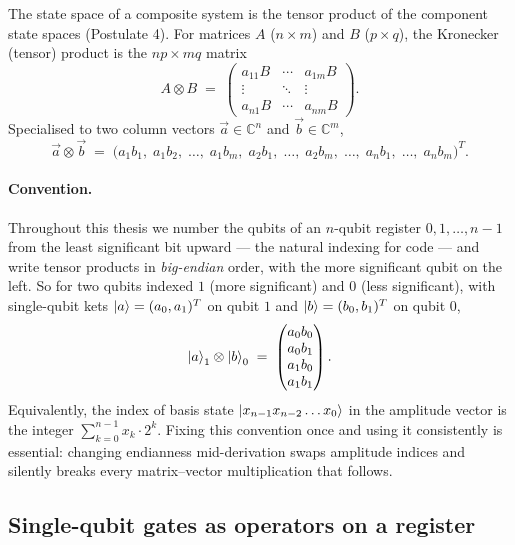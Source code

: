 The state space of a composite system is the tensor product of the component state spaces (Postulate 4). For matrices $A$ ($n\times m$) and $B$ ($p\times q$), the Kronecker (tensor) product is the $np\times mq$ matrix
\begin{equation}
A\otimes B \;=\; \begin{pmatrix} a_{11}B & \cdots & a_{1m}B \\ \vdots & \ddots & \vdots \\ a_{n1}B & \cdots & a_{nm}B \end{pmatrix}.
\end{equation}
Specialised to two column vectors $\vec{a}\in\mathbb{C}^n$ and $\vec{b}\in\mathbb{C}^m$,
\begin{equation}
\vec{a}\otimes\vec{b} \;=\; \bigl(a_1 b_1,\; a_1 b_2,\; \ldots,\; a_1 b_m,\; a_2 b_1,\; \ldots,\; a_2 b_m,\; \ldots,\; a_n b_1,\; \ldots,\; a_n b_m\bigr)^T.
\end{equation}

\paragraph{Convention.} Throughout this thesis we number the qubits of an $n$-qubit register $0, 1, \ldots, n-1$ from the least significant bit upward --- the natural indexing for code --- and write tensor products in \emph{big-endian} order, with the more significant qubit on the left. So for two qubits indexed $1$ (more significant) and $0$ (less significant), with single-qubit kets $\mathinner{|{a}\rangle}=(a_0, a_1)^T$ on qubit $1$ and $\mathinner{|{b}\rangle}=(b_0, b_1)^T$ on qubit $0$,
\begin{equation}
\mathinner{|{a}\rangle}_1 \otimes \mathinner{|{b}\rangle}_0 \;=\; \begin{pmatrix} a_0 b_0 \\ a_0 b_1 \\ a_1 b_0 \\ a_1 b_1 \end{pmatrix}.
\end{equation}
Equivalently, the index of basis state $\mathinner{|{x_{n-1} x_{n-2} \ldots x_0}\rangle}$ in the amplitude vector is the integer $\sum_{k=0}^{n-1} x_k \cdot 2^k$. Fixing this convention once and using it consistently is essential: changing endianness mid-derivation swaps amplitude indices and silently breaks every matrix--vector multiplication that follows.

\subsection{Single-qubit gates as operators on a register}

